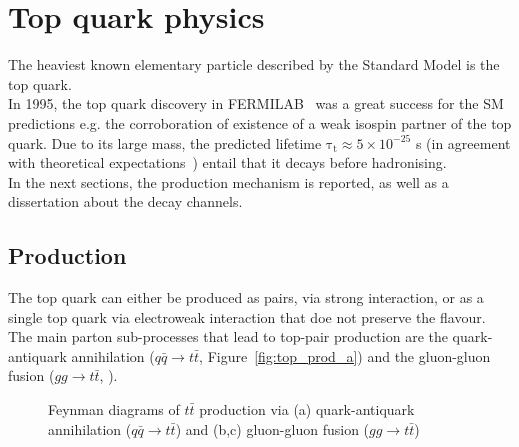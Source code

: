 \section{Top quark physics}
The heaviest known elementary particle described by the Standard Model is the top quark.\\
In 1995, the top quark discovery in FERMILAB~\cite{CDF,D0} was a great success for the SM predictions e.g. the corroboration of existence  of a weak isospin partner of the top quark.
Due to its large mass, the predicted lifetime $\mathrm{\tau_{t} \approx 5\times 10^{−25}}$ s (in agreement with theoretical expectations~\cite{LHcb_top}) entail that it decays before hadronising.\\
In the next sections, the production mechanism is reported, as well as a dissertation about the decay channels.
\subsection{Production}
The top quark can either be produced as pairs, via strong interaction, or as a single top quark via electroweak interaction that doe not preserve the flavour.\\
The main parton sub-processes that lead to top-pair production are the quark-antiquark annihilation ($q\bar{q}\rightarrow t\bar{t}$, Figure~\ref{fig:top_prod_a}) and the gluon-gluon fusion ($gg\rightarrow t\bar{t}$, ).\\
\begin{figure}[h]
	\centering
	\quad
	\quad
	\caption{Feynman diagrams of $t\bar{t}$ production via (a) quark-antiquark annihilation ($q\bar{q}\rightarrow t\bar{t}$) and (b,c) gluon-gluon fusion ($gg\rightarrow t\bar{t}$) }
\end{figure}
